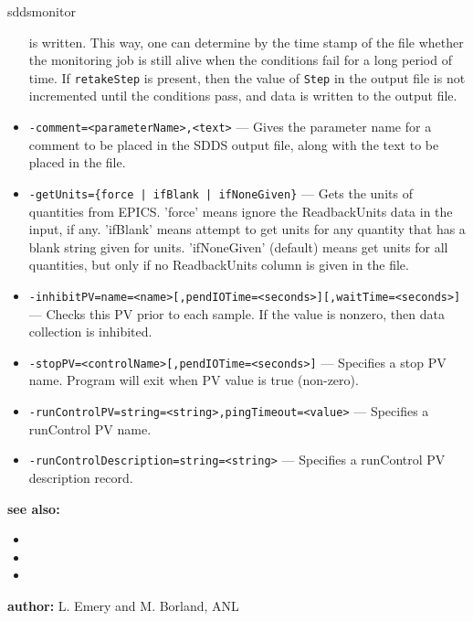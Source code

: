 \begin{sddsprog}{sddsmonitor}
\begin{itemize}
                is written. This way, one can determine by the time stamp of the file
                whether the monitoring job is still alive
                when the conditions fail for a long period of time. If \verb+retakeStep+ is
                present, then the value of \verb+Step+ in the output file is not
                incremented until the conditions pass, and data is written to the output file.
  \item {\verb+-comment=<parameterName>,<text>+} ---
                Gives the parameter name for a comment to be placed in the SDDS output file,
                along with the text to be placed in the file.
  \item {\verb+-getUnits={force | ifBlank | ifNoneGiven}+} ---
                Gets the units of quantities from EPICS. 'force' means ignore the ReadbackUnits
                data in the input, if any. 'ifBlank' means attempt to get units for any quantity
                that has a blank string given for units. 'ifNoneGiven' (default) means get units
                for all quantities, but only if no ReadbackUnits column is given in the file.
  \item {\tt -inhibitPV=name=<name>[,pendIOTime=<seconds>][,waitTime=<seconds>]} ---
                Checks this PV prior to each sample. If the value is nonzero, then data
                collection is inhibited.
  \item {\tt -stopPV=<controlName>[,pendIOTime=<seconds>]} --- Specifies a stop PV name.
                Program will exit when PV value is true (non-zero).
  \item {\tt -runControlPV=string=<string>,pingTimeout=<value>} --- Specifies a runControl PV name.
  \item {\tt -runControlDescription=string=<string>} --- Specifies a runControl PV description record.
\end{itemize}

\item \textbf{see also:}
\begin{itemize}
  \item {}
  \item {}
  \item {}
\end{itemize}
\item \textbf{author:} L. Emery and M. Borland, ANL
\end{sddsprog}
